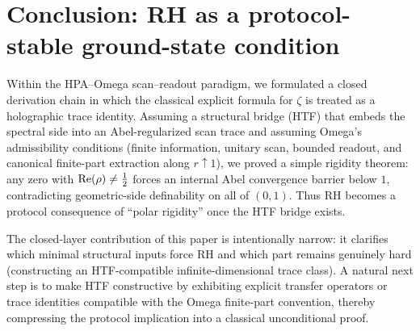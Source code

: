 
\section{Conclusion: RH as a protocol-stable ground-state condition}
\label{sec:conclusion}

Within the HPA--Omega scan--readout paradigm, we formulated a closed derivation chain in which the classical explicit formula for $\zeta$ is treated as a holographic trace identity.
Assuming a structural bridge (HTF) that embeds the spectral side into an Abel-regularized scan trace and assuming Omega's admissibility conditions (finite information, unitary scan, bounded readout, and canonical finite-part extraction along $r\uparrow 1$), we proved a simple rigidity theorem: any zero with $\operatorname{Re}(\rho)\neq \tfrac{1}{2}$ forces an internal Abel convergence barrier below $1$, contradicting geometric-side definability on all of $(0,1)$.
Thus RH becomes a protocol consequence of ``polar rigidity'' once the HTF bridge exists.

The closed-layer contribution of this paper is intentionally narrow: it clarifies which minimal structural inputs force RH and which part remains genuinely hard (constructing an HTF-compatible infinite-dimensional trace class).
A natural next step is to make HTF constructive by exhibiting explicit transfer operators or trace identities compatible with the Omega finite-part convention, thereby compressing the protocol implication into a classical unconditional proof.



